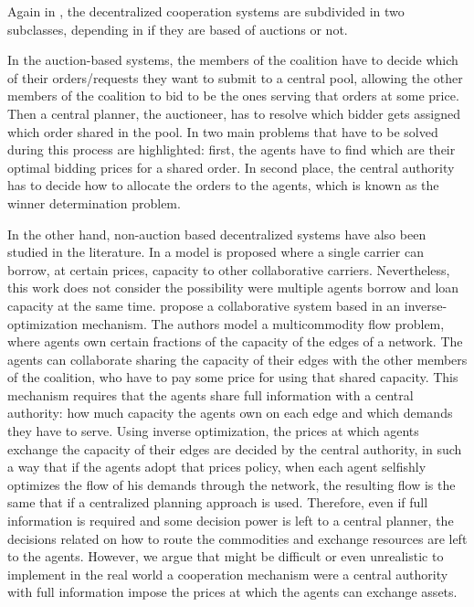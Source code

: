 \documentclass{article}
\begin{document}
Again in \textcite{GANSTERER2017}, the decentralized cooperation systems are subdivided in two subclasses, depending in if they are based of auctions or not.

In the auction-based systems, the members of the coalition have to decide which of their orders/requests they want to submit to a central pool, allowing the other members of the coalition to bid to be the ones serving that orders at some price. Then a central planner, the auctioneer, has to resolve which bidder gets assigned which order shared in the pool. In \textcite{PAN2019} two main problems that have to be solved during this process are highlighted: first, the agents have to find which are their optimal bidding prices for a shared order. In second place, the central authority has to decide how to allocate the orders to the agents, which is known as the winner determination problem. 

In the other hand, non-auction based decentralized systems have also been studied in the literature. In \textcite{HERNANDEZ2014} a model is proposed where a single carrier can borrow, at certain prices, capacity to other collaborative carriers. Nevertheless, this work does not consider the possibility were multiple agents borrow and loan capacity at the same time. \textcite{AGARWAL2008520}  propose a collaborative system based in an
inverse-optimization mechanism. The authors model a multicommodity flow problem, where agents own certain
fractions of the capacity of the edges of a network. The agents can collaborate sharing the capacity of their edges with the other members of the coalition, who have to pay some price for using that shared capacity. This mechanism requires that the agents share full information with a central authority: how much capacity the agents own on each edge and which demands they have to serve.  Using inverse optimization, the prices at which agents exchange the capacity of their edges are decided by the central authority, in such a way that if the agents adopt that prices policy, when each
agent selfishly optimizes the flow of his demands through the network, the resulting flow is the same that if a centralized planning approach is used. Therefore, even if full information is required and some decision power is left to a central planner, the decisions related on how to route the commodities and exchange resources are left to the agents. However, we argue that might be difficult or even unrealistic to implement in the real world a cooperation mechanism were a central authority with full information impose the prices at which the agents can exchange assets. 
\end{document}
